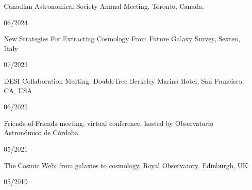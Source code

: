 \documentclass[12pt, a4paper]{article} %
\begin{document}
\begin{minipage}[t]{0.7\textwidth}
\begin{flushleft}%
  \setlength{\leftskip}{0.2cm}%
    Canadian Astronomical Society Annual Meeting, Toronto, Canada.
\end{flushleft}
\end{minipage}
\begin{minipage}[t]{0.3\textwidth}
\hfill 06/2024
\end{minipage}
\vspace{0.2cm}

\begin{minipage}[t]{0.7\textwidth}
\begin{flushleft}%
  \setlength{\leftskip}{0.2cm}%
    New Strategies For Extracting Cosmology From Future Galaxy Survey, Sexten, Italy
\end{flushleft}
\end{minipage}
\begin{minipage}[t]{0.3\textwidth}
\hfill 07/2023
\end{minipage}
\vspace{0.2cm}

\begin{minipage}[t]{0.7\textwidth}
\begin{flushleft}%
  \setlength{\leftskip}{0.2cm}%
    DESI Collaboration Meeting, DoubleTree Berkeley Marina Hotel, San Francisco, CA, USA
\end{flushleft}
\end{minipage}
\begin{minipage}[t]{0.3\textwidth}
\hfill 06/2022
\end{minipage}
\vspace{0.2cm}

\begin{minipage}[t]{0.7\textwidth}
\begin{flushleft}%
  \setlength{\leftskip}{0.2cm}%
    Friends-of-Friends meeting, virtual conference, hosted by Observatorio Astron\'omico de C\'ordoba
\end{flushleft}
\end{minipage}
\begin{minipage}[t]{0.3\textwidth}
\hfill 05/2021
\end{minipage}
\vspace{0.2cm}

\begin{minipage}[t]{0.7\textwidth}
\begin{flushleft}%
  \setlength{\leftskip}{0.2cm}%
The Cosmic Web: from galaxies to cosmology, Royal Observatory, Edinburgh, UK
\end{flushleft}
\end{minipage}
\begin{minipage}[t]{0.3\textwidth}
\hfill 05/2019
\end{minipage}
\vspace{0.2cm}
\end{document}
